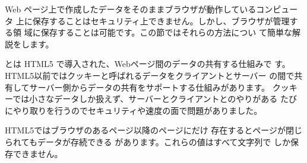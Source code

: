 Web ページ上で作成したデータをそのままブラウザが動作しているコンピュータ
上に保存することはセキュリティ上できません。しかし、ブラウザが管理する領
域に保存することは可能です。この節ではそれらの方法につい
て簡単な解説をします。

とは HTML5 で導入された、Webページ間のデータの共有する仕組みで
す。HTML5以前ではクッキーと呼ばれるデータをクライアントとサーバー
の間で共有してサーバー側からデータの共有をサポートする仕組みがあります。
クッキーでは小さなデータしか扱えず、サーバーとクライアントとのやりがある
たびにやり取りを行うのでセキュリティや速度の面で問題がありました。

HTML5ではブラウザのあるページ以降のページにだけ
存在するとページが閉じられてもデータが存続できる
があります。これらの値はすべて文字列で
しか保存できません。

